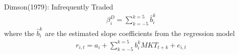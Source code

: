 \documentclass{beamer}
\begin{document}
\begin{frame}{Dimson(1979): Infrequently Traded}
	\begin{align}
		\beta_{i}^{D}=\sum_{k=-5}^{k=5} \hat{b}_{i}^{k}
	\end{align}
where the $ \hat{b}_{i}^{k} $ are the estimated slope coefficients from the regression model
\begin{align}
	r_{i, t}=a_{i}+\sum_{k=-5}^{k=5} b_{i}^{k} M K T_{t+k}+e_{i, t}
\end{align}
\end{frame}




\end{document}
